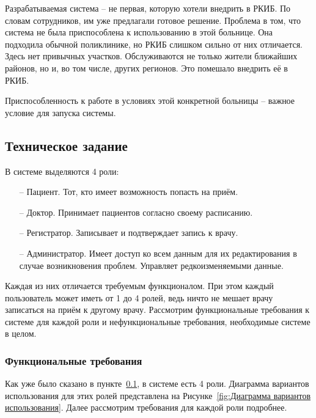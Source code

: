 \documentclass[a4paper,article]{article}
\begin{document}
        Разрабатываемая система -- не первая, которую хотели внедрить в РКИБ. По словам сотрудников, им уже предлагали готовое решение. Проблема в том, что система не была приспособлена к использованию в этой больнице. Она подходила обычной поликлинике, но РКИБ слишком сильно от них отличается. Здесь нет привычных участков. Обслуживаются не только жители ближайших районов, но и, во том числе, других регионов. Это помешало внедрить её в РКИБ.

        Приспособленность к работе в условиях этой конкретной больницы -- важное условие для запуска системы.

    \subsection{Техническое задание}\label{Техническое задание}

        В системе выделяются 4 роли:

        \begin{itemize}[nolistsep]
            \item[--] Пациент. Тот, кто имеет возможность попасть на приём.
            \item[--] Доктор. Принимает пациентов согласно своему расписанию.
            \item[--] Регистратор. Записывает и подтверждает запись к врачу.
            \item[--] Администратор. Имеет доступ ко всем данным для их редактирования в случае возникновения проблем. Управляет редкоизменяемыми данные.
        \end{itemize}

        Каждая из них отличается требуемым функционалом. При этом каждый пользователь может иметь от 1 до 4 ролей, ведь ничто не мешает врачу записаться на приём к другому врачу. Рассмотрим функциональные требования к системе для каждой роли и нефункциональные требования, необходимые системе в целом.

    \newpage

    \subsubsection{Функциональные требования}\label{ТЗ. Функциональные требования}

        Как уже было сказано в пункте~\ref{Техническое задание}, в системе есть 4 роли. Диаграмма вариантов использования для этих ролей представлена на Рисунке~\ref{fig:Диаграмма вариантов использования}. Далее рассмотрим требования для каждой роли подробнее.
\end{document}
